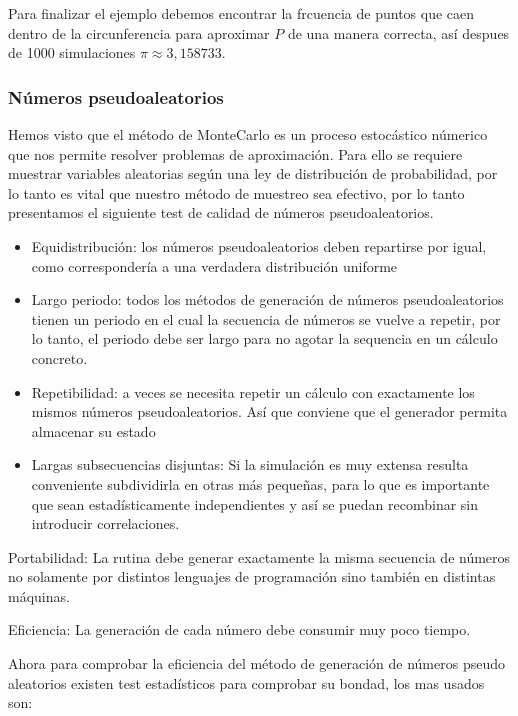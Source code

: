 \documentclass[
  12pt,
]{krantz}
\theoremstyle{definition}
\theoremstyle{definition}
\theoremstyle{definition}
\theoremstyle{remark}
\begin{document}
Para finalizar el ejemplo debemos encontrar la frcuencia de puntos que caen dentro de la circunferencia para aproximar \(P\) de una manera correcta, así despues de 1000 simulaciones \(\pi\approx 3,158733\).

\hypertarget{numeros-pseudoaleatorios}{%
\subsubsection{Números pseudoaleatorios}\label{numeros-pseudoaleatorios}}

Hemos visto que el método de MonteCarlo es un proceso estocástico númerico que nos permite resolver problemas de aproximación. Para ello se requiere muestrar variables aleatorias según una ley de distribución de probabilidad, por lo tanto es vital que nuestro método de muestreo sea efectivo, por lo tanto presentamos el siguiente test de calidad de números pseudoaleatorios.

\begin{itemize}
\item
  Equidistribución: los números pseudoaleatorios deben repartirse por igual, como correspondería a una verdadera distribución uniforme
\item
  Largo periodo: todos los métodos de generación de números pseudoaleatorios tienen un periodo en el cual la secuencia de números se vuelve a repetir, por lo tanto, el periodo debe ser largo para no agotar la sequencia en un cálculo concreto.
\item
  Repetibilidad: a veces se necesita repetir un cálculo con exactamente los mismos números pseudoaleatorios. Así que conviene que el generador permita almacenar su estado
\item
  Largas subsecuencias disjuntas: Si la simulación es muy extensa resulta conveniente subdividirla en otras más pequeñas, para lo que es importante que sean estadísticamente independientes y así se puedan recombinar sin introducir correlaciones.
\end{itemize}

Portabilidad: La rutina debe generar exactamente la misma secuencia de números no solamente por distintos lenguajes de programación sino también en distintas máquinas.

Eficiencia: La generación de cada número debe consumir muy poco tiempo.

Ahora para comprobar la eficiencia del método de generación de números pseudo aleatorios existen test estadísticos para comprobar su bondad, los mas usados son:
\end{document}
